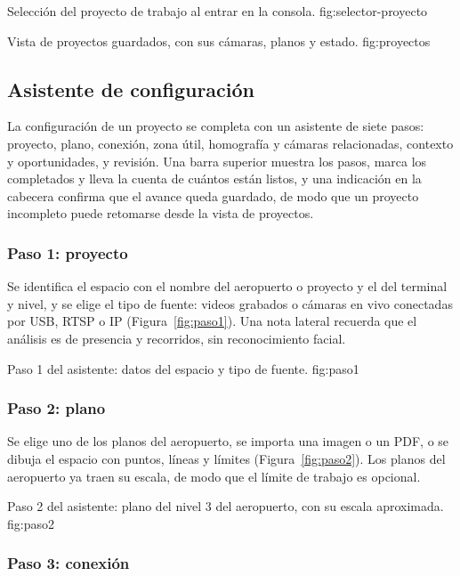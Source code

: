   {Selección del proyecto de trabajo al entrar en la consola.}
  {fig:selector-proyecto}

  {Vista de proyectos guardados, con sus cámaras, planos y estado.}
  {fig:proyectos}

\subsection{Asistente de configuración}
\label{subsec:diseno-asistente}

La configuración de un proyecto se completa con un asistente de siete pasos: proyecto, plano,
conexión, zona útil, homografía y cámaras relacionadas, contexto y oportunidades, y revisión.
Una barra superior muestra los pasos, marca los completados y lleva la cuenta de cuántos están
listos, y una indicación en la cabecera confirma que el avance queda guardado, de modo que un
proyecto incompleto puede retomarse desde la vista de proyectos.

\subsubsection*{Paso 1: proyecto}

Se identifica el espacio con el nombre del aeropuerto o proyecto y el del terminal y nivel, y se
elige el tipo de fuente: videos grabados o cámaras en vivo conectadas por USB, RTSP o IP
(Figura~\ref{fig:paso1}). Una nota lateral recuerda que el análisis es de presencia y recorridos,
sin reconocimiento facial.

  {Paso 1 del asistente: datos del espacio y tipo de fuente.}
  {fig:paso1}

\subsubsection*{Paso 2: plano}

Se elige uno de los planos del aeropuerto, se importa una imagen o un PDF, o se dibuja el espacio
con puntos, líneas y límites (Figura~\ref{fig:paso2}). Los planos del aeropuerto ya traen su
escala, de modo que el límite de trabajo es opcional.

  {Paso 2 del asistente: plano del nivel 3 del aeropuerto, con su escala aproximada.}
  {fig:paso2}

\subsubsection*{Paso 3: conexión}

